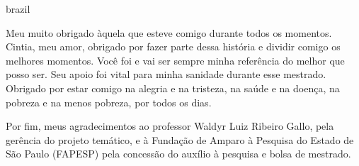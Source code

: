 \begin{otherlanguage*}{brazil}
\begin{agradecimentos}
Meu muito obrigado àquela que esteve comigo durante todos os momentos. Cintia, meu amor, obrigado por fazer parte dessa história e dividir comigo os melhores momentos. Você foi e vai ser sempre minha referência do melhor que posso ser. Seu apoio foi vital para minha sanidade durante esse mestrado. Obrigado por estar comigo na alegria e na tristeza, na saúde e na doença, na pobreza e na menos pobreza, por todos os dias.

Por fim, meus agradecimentos ao professor Waldyr Luiz Ribeiro Gallo, pela gerência do projeto temático, e à Fundação de Amparo à Pesquisa do Estado de São Paulo (FAPESP) pela concessão do auxílio à pesquisa e bolsa de mestrado.  

	
	
\end{agradecimentos}
\end{otherlanguage*}


